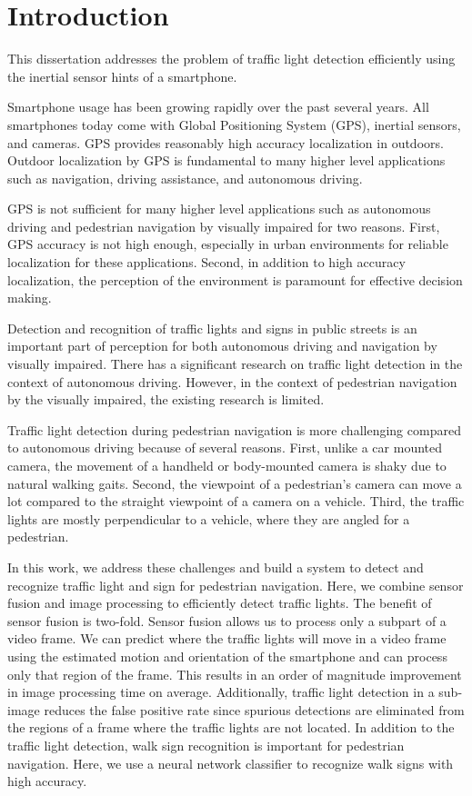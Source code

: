 \chapter{Introduction}

This dissertation addresses the problem of traffic light detection efficiently using the inertial sensor hints of a smartphone.

Smartphone usage has been growing rapidly over the past several years. 
All smartphones today come with Global Positioning System (GPS), inertial sensors, and cameras. 
GPS provides reasonably high accuracy localization in outdoors. 
Outdoor localization by GPS is fundamental to many higher level applications such as navigation, driving assistance, and autonomous driving.

GPS is not sufficient for many higher level applications such as autonomous driving and pedestrian navigation by visually impaired for two reasons.
First, GPS accuracy is not high enough, especially in urban environments for reliable localization for these applications. 
Second, in addition to high accuracy localization, the perception of the environment is paramount for effective decision making. 

Detection and recognition of traffic lights and signs in public streets is an important part of perception for both autonomous driving and navigation by visually impaired.  
There has a significant research \cite{traffic_google} on traffic light detection in the context of autonomous driving. 
However, in the context of pedestrian navigation by the visually impaired, the existing research is limited. 

Traffic light detection during pedestrian navigation is more challenging compared to autonomous driving because of several reasons. 
First, unlike a car mounted camera, the movement of a handheld or body-mounted camera is shaky due to natural walking gaits. 
Second, the viewpoint of a pedestrian's camera can move a lot compared to the straight viewpoint of a camera on a vehicle.
Third, the traffic lights are mostly perpendicular to a vehicle, where they are angled for a pedestrian. 

In this work, we address these challenges and build a system to detect and recognize traffic light and sign for pedestrian navigation.
Here, we combine sensor fusion and image processing to efficiently detect traffic lights. 
The benefit of sensor fusion is two-fold.
Sensor fusion allows us to process only a subpart of a video frame.
We can predict where the traffic lights will move in a video frame using the estimated motion and orientation of the smartphone and can process only that region of the frame. 
This results in an order of magnitude improvement in image processing time on average. 
Additionally, traffic light detection in a sub-image reduces the false positive rate since spurious detections are eliminated from the regions of a frame where the traffic lights are not located.
In addition to the traffic light detection, walk sign recognition is important for pedestrian navigation.
Here, we use a neural network classifier to recognize walk signs with high accuracy. 

